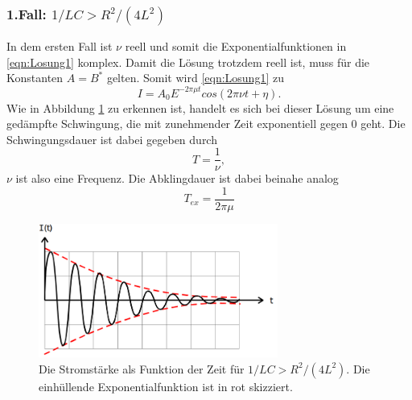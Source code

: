 \subsubsection*{1.Fall: $1/LC>R^2/(4L^2)$}
In dem ersten Fall ist $\nu$ reell und somit die Exponentialfunktionen in \eqref{eqn:Losung1} komplex. Damit die Lösung trotzdem reell ist, muss
für die Konstanten $A=B^{*}$ gelten. Somit wird \eqref{eqn:Losung1} zu
\begin{equation*}
    I=A_0E^{-2\pi\mu t} cos(2\pi\nu t+\eta).
    \label{eqn:Fall1}
\end{equation*}
Wie in Abbildung \ref{fig:Fall1} zu erkennen ist, handelt es sich bei dieser Lösung um eine gedämpfte Schwingung, die mit zunehmender Zeit
exponentiell gegen 0 geht. Die Schwingungsdauer ist dabei gegeben durch
\begin{equation*}
    T=\frac{1}{\nu} ,
\end{equation*}
$\nu$ ist also eine Frequenz. Die Abklingdauer ist dabei beinahe analog
\begin{equation}
    T_{ex}=\frac{1}{2\pi\mu}
    \label{eqn:Tex}
\end{equation}
\begin{figure}[H]
    \centering
    \includegraphics[width=0.7\textwidth]{pictures/Fall1.png}
    \caption{Die Stromstärke als Funktion der Zeit für $1/LC>R^2/(4L^2)$. Die einhüllende Exponentialfunktion ist in rot skizziert.\cite{AP01}}
    \label{fig:Fall1}
\end{figure}

